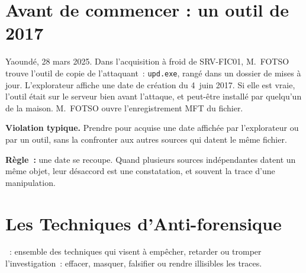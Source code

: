 \bigskip

\section*{Avant de commencer : un outil de 2017}

Yaoundé, 28 mars 2025. Dans l'acquisition à froid de SRV-FIC01, M.~FOTSO
trouve l'outil de copie de l'attaquant~: \texttt{upd.exe}, rangé dans un
dossier de mises à jour. L'explorateur affiche une date de création du
4~juin 2017. Si elle est vraie, l'outil était sur le serveur bien avant
l'attaque, et peut-être installé par quelqu'un de la maison. M.~FOTSO ouvre
l'enregistrement MFT du fichier.

\begin{boxalert}
\textbf{Violation typique.} Prendre pour acquise une date affichée par
l'explorateur ou par un outil, sans la confronter aux autres sources qui
datent le même fichier.

\smallskip
\textbf{Règle~:} une date se recoupe. Quand plusieurs sources indépendantes
datent un même objet, leur désaccord est une constatation, et souvent la
trace d'une manipulation.
\end{boxalert}

\separateur

\section{Les Techniques d'Anti-forensique}
\label{sec:c13-techniques}

\begin{boxdef}
\textbf{}~: ensemble des techniques qui visent à
empêcher, retarder ou tromper l'investigation~: effacer, masquer, falsifier
ou rendre illisibles les traces.
\end{boxdef}

